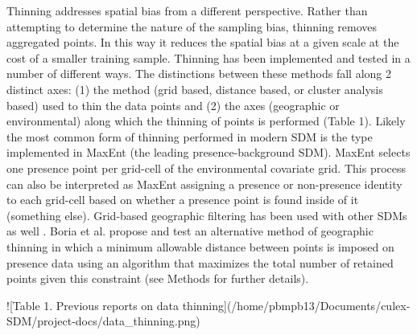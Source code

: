 Thinning addresses spatial bias from a different perspective. Rather than attempting to determine the nature of the sampling bias, thinning removes aggregated points. In this way it reduces the spatial bias at a given scale at the cost of a smaller training sample. Thinning has been implemented and tested in a number of diﬀerent ways. The distinctions between these methods fall along 2 distinct axes: (1) the method (grid based, distance based, or cluster analysis based) used to thin the data points and (2) the axes (geographic or environmental) along which the thinning of points is performed (Table 1). Likely the most common form of thinning performed in modern SDM is the type implemented in MaxEnt (the leading presence-background SDM). MaxEnt selects one presence point per grid-cell of the environmental covariate grid. This process can also be interpreted as MaxEnt assigning a presence or non-presence identity to each grid-cell based on whether a presence point is found inside of it \cite{Phillips:2006ff} (something else). Grid-based geographic ﬁltering has been used with other SDMs as well \cite{Varela:2014ck}. Boria et al. \cite{Boria:2014fs} propose and test an alternative method of geographic thinning in which a minimum allowable distance between points is imposed on presence data using an algorithm that maximizes the total number of retained points given this constraint (see Methods for further details). 

![Table 1. Previous reports on data thinning](/home/pbmpb13/Documents/culex-SDM/project-docs/data_thinning.png)

